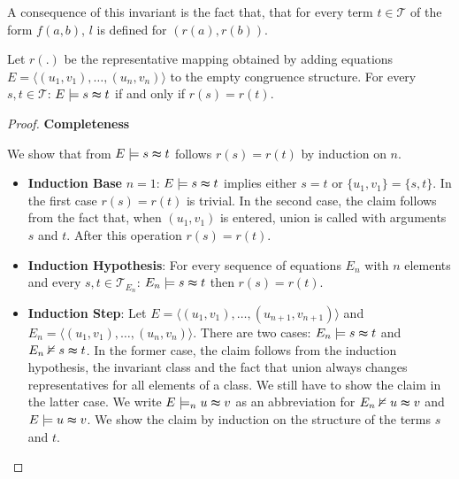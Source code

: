 A consequence of this invariant is the fact that, that for every term $t \in \mathcal{T}$ of the form $f(a,b)$, $l$ is defined for $(r(a),r(b))$.

\begin{proposition}

Let $r(.)$ be the representative mapping obtained by adding equations $E = \langle (u_1,v_1), \ldots, (u_n,v_n) \rangle $ to the empty congruence structure.
For every $s,t \in \mathcal{T}$: $E \models s \thickapprox t$ if and only if $r(s) = r(t)$.

\end{proposition}

\begin{proof}

\textbf{Completeness}

We show that from $E \models s \thickapprox t$ follows $r(s) = r(t)$ by induction on $n$.

\begin{itemize}
\item \textbf{Induction Base} $n=1$: $E \models s \thickapprox t$ implies either $s = t$ or $\{u_1,v_1\} = \{s,t\}$.
In the first case $r(s) = r(t)$ is trivial. 
In the second case, the claim follows from the fact that, when $(u_1,v_1)$ is entered, union is called with arguments $s$ and $t$.
After this operation $r(s) = r(t)$.

\item \textbf{Induction Hypothesis}: For every sequence of equations $E_n$ with $n$ elements and every $s,t \in \mathcal{T}_{E_n}$: $E_n \models s \thickapprox t$ then $r(s) = r(t)$.

\item \textbf{Induction Step}: Let $E = \langle (u_1,v_1), \ldots, (u_{n+1},v_{n+1}) \rangle$ and $E_n = \langle (u_1,v_1), \ldots, (u_n,v_n) \rangle$.
There are two cases: $E_n \models s\thickapprox t$ and $E_n \nvDash s\thickapprox t$.
In the former case, the claim follows from the induction hypothesis, the invariant class and the fact that union always changes representatives for all elements of a class.
We still have to show the claim in the latter case.
We write $E \models_n u \thickapprox v$ as an abbreviation for $E_n \nvDash u \thickapprox v$ and $E \models u \thickapprox v$.
We show the claim by induction on the structure of the terms $s$ and $t$.


\end{itemize}
\end{proof}
